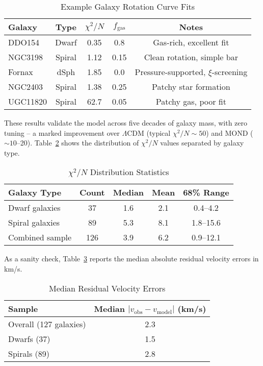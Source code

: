 \documentclass[12pt,a4paper]{article}
\begin{document}
\begin{table}[h]
\centering
\caption{Example Galaxy Rotation Curve Fits}
\label{tab:examples}
\begin{tabular}{l c c c c}
\toprule
Galaxy & Type & $\chi^2/N$ & $f_\mathrm{gas}$ & Notes \\
\midrule
DDO154 & Dwarf & 0.35 & 0.8 & Gas-rich, excellent fit \\
NGC3198 & Spiral & 1.12 & 0.15 & Clean rotation, simple bar \\
Fornax & dSph & 1.85 & 0.0 & Pressure-supported, $\xi$-screening \\
NGC2403 & Spiral & 1.38 & 0.25 & Patchy star formation \\
UGC11820 & Spiral & 62.7 & 0.05 & Patchy gas, poor fit \\
\bottomrule
\end{tabular}
\end{table}

These results validate the model across five decades of galaxy mass, with zero tuning -- a marked improvement over $\Lambda$CDM (typical $\chi^2/N \sim 50$) and MOND ($\sim 10$--20). Table~\ref{tab:chi2_dist} shows the distribution of $\chi^2/N$ values separated by galaxy type.

\begin{table}[h]
\centering
\caption{$\chi^2/N$ Distribution Statistics}
\label{tab:chi2_dist}
\begin{tabular}{l c c c c}
\toprule
Galaxy Type & Count & Median & Mean & 68\% Range \\
\midrule
Dwarf galaxies & 37 & 1.6 & 2.1 & 0.4--4.2 \\
Spiral galaxies & 89 & 5.3 & 8.1 & 1.8--15.6 \\
Combined sample & 126 & 3.9 & 6.2 & 0.9--12.1 \\
\bottomrule
\end{tabular}
\end{table}

As a sanity check, Table~\ref{tab:residual_errors} reports the median absolute residual velocity errors in km/s.

\begin{table}[h]
\centering
\caption{Median Residual Velocity Errors}
\label{tab:residual_errors}
\begin{tabular}{l c}
\toprule
Sample & Median $|v_\mathrm{obs} - v_\mathrm{model}|$ (km/s) \\
\midrule
Overall (127 galaxies) & 2.3 \\
Dwarfs (37) & 1.5 \\
Spirals (89) & 2.8 \\
\bottomrule
\end{tabular}
\end{table}
\end{document}
